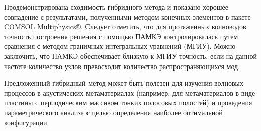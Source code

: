 \documentclass[press]{vestnik}
\begin{document}
Продемонстрирована сходимость гибридного метода и показано хорошее совпадение с результатами, полученными методом конечных элементов в пакете COMSOL Multiphysics®. Следует отметить, что для протяженных волноводов точность построения решения с помощью ПАМКЭ контролировалась путем сравнения с методом граничных интегральных уравнений (МГИУ). Можно заключить, что ПАМКЭ обеспечивает близкую к МГИУ точность, если на данной частоте количество узлов превосходит количество распространяющихся мод.

Предложенный гибридный метод может быть полезен для изучения волновых процессов в акустических метаматериалах (например, для метаматериалов в виде пластины с периодическим массивом тонких полосовых полостей) \cite{Golub_2023} и проведения параметрического анализа с целью определения наиболее оптимальной конфигурации.

\end{document}
